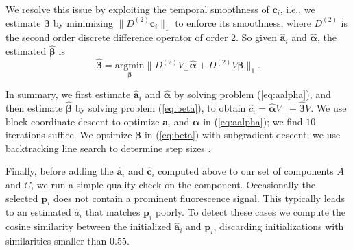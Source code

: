 \documentclass[10pt,letterpaper]{article}
\begin{document}
{%



We resolve this issue by exploiting the temporal smoothness of $\bm{c}_i$, i.e., we estimate $\bm{\beta}$ by minimizing $\|D^{(2)}\bm{c}_i\|_1$ to enforce its smoothness, where $D^{(2)}$ is the second order discrete difference operator of order 2. So given $\hat{\bm{a}}_i$ and $\hat{\bm{\alpha}}$, the estimated $\hat{\bm{\beta}}$ is
\begin{equation}
	\hat{\bm{\beta}} = \underset{\bm\beta}{\text{argmin}}\|D^{(2)}V_\perp\hat{\bm\alpha} + D^{(2)}V{\bm\beta }\|_1. 
    \label{eq:beta}
\end{equation}

In summary, we first estimate $\hat{\bm{a}}_i$ and $\hat{\bm{\alpha}}$ by solving problem (\ref{eq:aalpha}),
and then estimate $\hat{\bm{\beta}}$ by solving problem (\ref{eq:beta}), to obtain $\hat{c}_i = \hat{\bm{\alpha}}V_\perp + \hat{\bm{\beta}}V$.  
We use block coordinate descent \citep{Cichocki2007} to optimize $\bm{a}_i$ and $\bm{\alpha}$ in (\ref{eq:aalpha}); we find $10$ iterations suffice. We optimize $\bm{\beta}$ in (\ref{eq:beta}) with subgradient descent; we use backtracking line search to determine step sizes \citep{Boyd2004}. 





Finally, before adding the $\hat{\bm{a}}_i$ and $\hat{\bm{c}}_i$ computed above to our set of components $A$ and $C$, we run a simple quality check on the component.  Occasionally the selected $\bm{p}_i$ does not contain a prominent fluorescence signal.  This typically leads to an estimated $\hat{a}_i$ that matches $\bm{p}_i$ poorly.  To detect these cases we compute the cosine similarity between the initialized $\hat{\bm a}_i$ and $\bm{p}_i$, discarding initializations with similarities smaller than $0.55$. 

}
\end{document}
